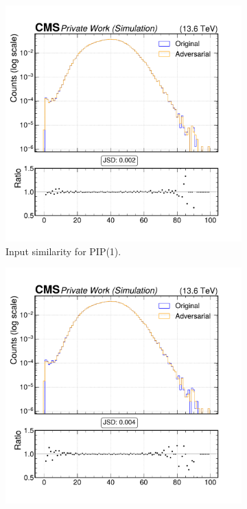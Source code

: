 \begin{figure}[h]
  \centering
  \begin{subfigure}[t]{0.32\textwidth}
    \includegraphics[width=\linewidth]{media/output/features/compare/intprob_1/cmp_global_features_npv.pdf}
    \caption{Input similarity for PIP(1).}
  \end{subfigure}\hfill
  \begin{subfigure}[t]{0.32\textwidth}
    \includegraphics[width=\linewidth]{media/output/features/compare/intprob_2/cmp_global_features_npv.pdf}

\end{subfigure}
\end{figure}
